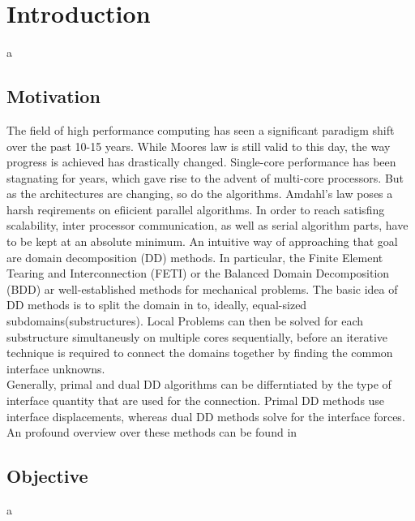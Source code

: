\chapter{Introduction} a
\section{Motivation}
The field of high performance computing has seen a significant paradigm shift over the past 10-15 years. While Moores law \cite{Moore1965} is still valid to this day, the way progress is achieved has drastically changed. Single-core performance has been stagnating for years, which gave rise to the advent of multi-core processors. But as the architectures are changing, so do the algorithms. Amdahl's law\cite{Rodgers1985} poses a harsh reqirements on efiicient parallel algorithms. In order to reach satisfing scalability, inter processor communication, as well as serial algorithm parts, have to be kept at an absolute minimum.
An intuitive way of approaching that goal are domain decomposition (DD) methods. In particular, the Finite Element Tearing and Interconnection (FETI) or the Balanced Domain Decomposition (BDD) ar well-established methods for mechanical problems.
The basic idea of DD methods is to split the domain in to, ideally, equal-sized subdomains(substructures). Local Problems can then be solved for each substructure simultaneusly on multiple cores sequentially, before an iterative technique is required to connect the domains together by finding the common interface unknowns.\\
Generally, primal and dual DD algorithms can be differntiated by the type of interface quantity that are used for the connection. Primal DD methods use interface displacements, whereas dual DD methods solve for the interface forces. An profound overview over these methods can be found in \cite{Gosselet2006}
\section{Objective} a